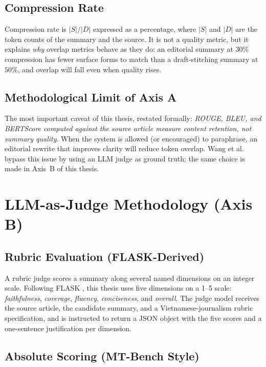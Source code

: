\subsection{Compression Rate}

Compression rate is $|S| / |D|$ expressed as a percentage, where $|S|$ and
$|D|$ are the token counts of the summary and the source. It is not a
quality metric, but it explains \textit{why} overlap metrics behave as they
do: an editorial summary at $30\%$ compression has fewer surface forms to
match than a draft-stitching summary at $50\%$, and overlap will fall
even when quality rises.

\subsection{Methodological Limit of Axis A}

The most important caveat of this thesis, restated formally:
\textit{ROUGE, BLEU, and BERTScore computed against the source article
measure content retention, not summary quality}. When the system is
allowed (or encouraged) to paraphrase, an editorial rewrite that improves
clarity will reduce token overlap. Wang et al.\ \cite{Wang2024} bypass
this issue by using an LLM judge as ground truth; the same choice is made
in Axis~B of this thesis.

\section{LLM-as-Judge Methodology (Axis B)}

\subsection{Rubric Evaluation (FLASK-Derived)}

A rubric judge scores a summary along several named dimensions
on an integer scale. Following FLASK \cite{Ye2023}, this thesis uses five
dimensions on a 1--5 scale: \textit{faithfulness}, \textit{coverage},
\textit{fluency}, \textit{conciseness}, and \textit{overall}.
The judge model receives the source article, the candidate summary, and a
Vietnamese-journalism rubric specification, and is instructed to return a
JSON object with the five scores and a one-sentence justification per
dimension.

\subsection{Absolute Scoring (MT-Bench Style)}

